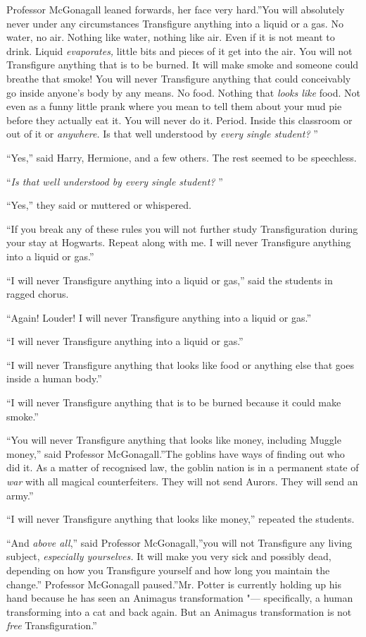 Professor McGonagall leaned forwards, her face very hard.''You will
absolutely never under any circumstances Transfigure anything into a
liquid or a gas. No water, no air. Nothing like water, nothing like air.
Even if it is not meant to drink. Liquid \emph{evaporates,} little bits
and pieces of it get into the air. You will not Transfigure anything
that is to be burned. It will make smoke and someone could breathe that
smoke! You will never Transfigure anything that could conceivably go
inside anyone's body by any means. No food. Nothing that \emph{looks
like} food. Not even as a funny little prank where you mean to tell them
about your mud pie before they actually eat it. You will never do it.
Period. Inside this classroom or out of it or \emph{anywhere.} Is that
well understood by \emph{every single student?} ''

``Yes,'' said Harry, Hermione, and a few others. The rest seemed to be
speechless.

``\emph{Is that well understood by every single student?} ''

``Yes,'' they said or muttered or whispered.

``If you break any of these rules you will not further study
Transfiguration during your stay at Hogwarts. Repeat along with me. I
will never Transfigure anything into a liquid or gas.''

``I will never Transfigure anything into a liquid or gas,'' said the
students in ragged chorus.

``Again! Louder! I will never Transfigure anything into a liquid or
gas.''

``I will never Transfigure anything into a liquid or gas.''

``I will never Transfigure anything that looks like food or anything
else that goes inside a human body.''

``I will never Transfigure anything that is to be burned because it
could make smoke.''

``You will never Transfigure anything that looks like money, including
Muggle money,'' said Professor McGonagall.''The goblins have ways of
finding out who did it. As a matter of recognised law, the goblin nation
is in a permanent state of \emph{war} with all magical counterfeiters.
They will not send Aurors. They will send an army.''

``I will never Transfigure anything that looks like money,'' repeated
the students.

``And \emph{above all},'' said Professor McGonagall,''you will not
Transfigure any living subject, \emph{especially yourselves.} It will
make you very sick and possibly dead, depending on how you Transfigure
yourself and how long you maintain the change.'' Professor McGonagall
paused.''Mr. Potter is currently holding up his hand because he has seen
an Animagus transformation "--- specifically, a human transforming into a
cat and back again. But an Animagus transformation is not \emph{free}
Transfiguration.''

